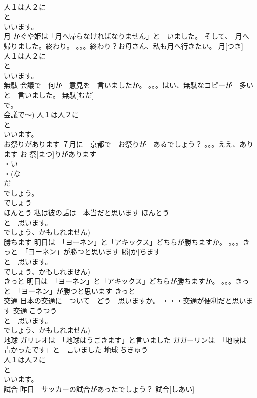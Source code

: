 \documentclass[8pt]{extreport}
\begin{document}
\begin{CJK}{UTF8}{min}
\\	人１は人２に
\\	と　
\\	いいます。
\\	月	かぐや姫は「月へ帰らなければなりません」と　いました。 そして、　月へ　帰りました。終わり。 。。。終わり？お母さん、私も月へ行きたい。	月[つき]			
\\	人１は人２に
\\	と　
\\	いいます。
\\	無駄	会議で　何か　意見を　言いましたか。 。。。はい、無駄なコピーが　多いと　言いました。	無駄[むだ]			
\\	で。
\\	会議で～) 人１は人２に
\\	と　
\\	いいます。
\\	お祭りがあります	７月に　京都で　お祭りが　あるでしょう？ 。。。ええ、あります	お 祭[まつ]りがあります			
\\	・い
\\	・(な
\\	だ
\\	でしょう。
\\	でしょう　
\\	ほんとう	私は彼の話は　本当だと思います	ほんとう			
\\	と　思います。
\\	でしょう、かもしれません)	
\\	勝ちます	明日は　「ヨーネン」と「アキックス」どちらが勝ちますか。 。。。きっと　「ヨーネン」が勝つと思います	勝[か]ちます			
\\	と　思います。
\\	でしょう、かもしれません)	
\\	きっと	明日は　「ヨーネン」と「アキックス」どちらが勝ちますか。 。。。きっと　「ヨーネン」が勝つと思います	きっと			
\\	交通	日本の交通に　ついて　どう　思いますか。 ・・・交通が便利だと思います	交通[こうつう]				
\\	と　思います。
\\	でしょう、かもしれません)	
\\	地球	ガリレオは　「地球はうごきます」と言いました ガガーリンは　「地峡は　青かったです」と　言いました	地球[ちきゅう]			
\\	人１は人２に
\\	と　
\\	いいます。
\\	試合	昨日　サッカーの試合があったでしょう？	試合[しあい]			

\end{CJK}
\end{document}
